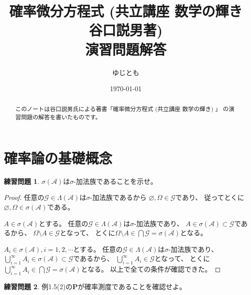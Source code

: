 \documentclass[uplatex]{jsarticle}
\theoremstyle{definition}
\newtheorem{prob}[prob]{練習問題}
\renewcommand{\emptyset}{\varnothing}
\def\P{\mathbf{P}}
\def\mcA{\mathcal{A}}
\def\mcG{\mathcal{G}}
\begin{document}
\title{確率微分方程式 (共立講座 数学の輝き 谷口説男著) \\
演習問題解答}
\date{\today}
\author{ゆじとも}

\maketitle

\begin{abstract}
  このノートは谷口説男氏による著書「確率微分方程式 (共立講座 数学の輝き) 」
  の演習問題の解答を書いたものです。
\end{abstract}

\tableofcontents






\newpage
\section{確率論の基礎概念}
\label{section 1}

\begin{prob}\label{prob: 1.1}
  \(\sigma(\mcA)\)は\(\sigma\)-加法族であることを示せ。
\end{prob}

\begin{proof}
  任意の\(\mcG\in \Lambda(\mcA)\)は\(\sigma\)-加法族であるから
  \(\emptyset, \Omega\in \mcG\)であり、
  従ってとくに\(\emptyset,\Omega\in \sigma(\mcA)\)である。

  \(A\in \sigma(\mcA)\)とする。
  任意の\(\mcG\in\Lambda(\mcA)\)は\(\sigma\)-加法族であり、
  \(A\in \sigma(\mcA)\subset \mcG\)であるから、
  \(\Omega \setminus A \in \mcG\)となって、
  とくに\(\Omega\setminus A\in \bigcap \mcG = \sigma(\mcA)\)となる。

  \(A_i\in\sigma(\mcA) , i=1,2,\cdots\)とする。
  任意の\(\mcG\in\Lambda(\mcA)\)は\(\sigma\)-加法族であり、
  \(\bigcup_{i=1}^\infty A_i\in \sigma(\mcA)\subset \mcG\)であるから、
  \(\bigcup_{i=1}^\infty A_i \in \mcG\)となって、
  とくに\(\bigcup_{i=1}^\infty A_i\in \bigcap \mcG = \sigma(\mcA)\)となる。
  以上で全ての条件が確認できた。
\end{proof}






\begin{prob}\label{prob: 1.2}
  例1.5(2)の\(\P\)が確率測度であることを確認せよ。
\end{prob}
\end{document}
